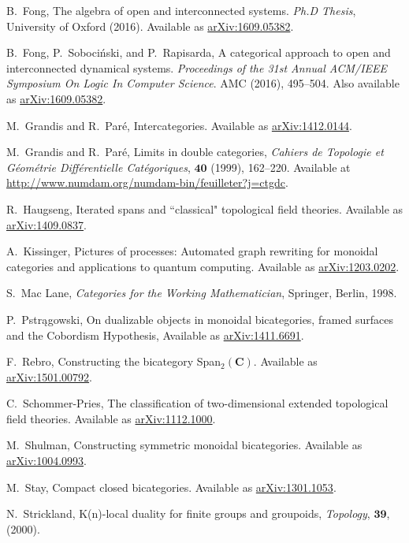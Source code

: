 \documentclass[11pt]{amsart}
\newcommand{\cat}[1]{\mathbf{#1}}
\theoremstyle{remark}
\theoremstyle{definition}
\begin{document}
\begin{thebibliography}{100}
B.~Fong,
The algebra of open and interconnected systems.
\emph{Ph.D Thesis},
University of Oxford (2016).
Available as \href{https://arxiv.org/abs/1609.05382}{arXiv:1609.05382}.

B.~Fong, P.~Soboci\'{n}ski, and P.~Rapisarda,
A categorical approach to open and interconnected dynamical systems.
\emph{Proceedings of the 31st Annual ACM/IEEE Symposium On Logic In Computer Science}.
AMC (2016), 495--504.
Also available as \href{https://arxiv.org/abs/1609.05382}{arXiv:1609.05382}.

M.~Grandis and R.~Par\'{e}, 
Intercategories.
Available as \href{https://arxiv.org/abs/1412.0144}{arXiv:1412.0144}.

M.~Grandis and R.~Par\'{e}, 
Limits in double categories, 
\emph{Cahiers de Topologie et G\'{e}om\'{e}trie Diff\'{e}rentielle Cat\'{e}goriques}, $\mathbf{40}$  
(1999), 162--220. 
Available at \href{http://www.numdam.org/numdam-bin/feuilleter?j=ctgdc}{http://www.numdam.org/numdam-bin/feuilleter?j=ctgdc}.

R.~Haugseng,
Iterated spans and ``classical"
topological field theories.
Available as \href{https://arxiv.org/abs/1409.0837}{arXiv:1409.0837}.

A.~Kissinger,
Pictures of processes: Automated 
graph rewriting for monoidal categories 
and applications to quantum computing.
Available as \href{https://arxiv.org/abs/1203.0202}{arXiv:1203.0202}.

S.~Mac Lane, 
\emph{Categories for the Working Mathematician},
Springer, Berlin, 1998.

P.~Pstrągowski,
On dualizable objects in monoidal bicategories, framed surfaces and the Cobordism Hypothesis, 
Available as \href{https://arxiv.org/abs/1411.6691}{arXiv:1411.6691}.

F.~Rebro, 
Constructing the bicategory Span$_{2}(\cat{C})$. 
Available as \href{https://arxiv.org/abs/1501.00792}{arXiv:1501.00792}.

C.~Schommer-Pries,
The classification of two-dimensional extended topological field theories. 
Available as \href{https://arxiv.org/abs/1112.1000}{arXiv:1112.1000}.

M.~Shulman, 
Constructing symmetric monoidal bicategories. 
Available as \href{http://arxiv.org/abs/1004.0993}{arXiv:1004.0993}.

 M.~Stay, 
Compact closed bicategories. 
Available as \href{http://arxiv.org/abs/1301.1053}{arXiv:1301.1053}.

N.\ Strickland,
K(n)-local duality for finite groups and groupoids,
\emph{Topology}, $\mathbf{39}$, (2000).

\end{thebibliography}
\end{document}

